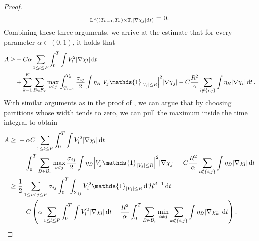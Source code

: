 \begin{proof}
\begin{equation*}
{		}_{ \operatorname{L}^{ 2 } \left(
			( T_{ k - 1 }, T_{ k } ) \times \operatorname{\mathbb{T}} ,
			\abs{ \nabla \chi_{ j } } \dd{ t }
			\right)
		}
		=
		0.
	\end{equation*}
	Combining these three arguments, we arrive at the estimate that for every 
	parameter $ \alpha \in ( 0 , 1 ) $, it holds that
	\begin{align*}
		A \geq &
		- C \alpha 
		\sum_{ 1 \leq l \leq P }
			\int_{ 0 }^{ T }
				\int
					V_{ l }^{ 2 }
				\abs{ \nabla \chi_{ l } }
			\dd{ t }
		\\
		& +
		\sum_{ k = 1 }^{ K }
			\sum_{ B \in \mathcal{ B }_{ r } }
				\max_{ i < j }
					\int_{ T_{ k - 1 } }^{ T_{ k } } 
						\frac{ \sigma_{ i j } }{ 2 }
						\int
							\eta_{ B }
							\abs{ V_{ j } \mathds{ 1 }_{ \abs{ V_{ j } } \leq R 
							} }^{ 2 }
						\abs{ \nabla \chi_{ j } }
					- 
					C \frac{ R^{ 2 } }{ \alpha }
					\sum_{ l \notin \{ i , j \} }
							\int
								\eta_{ B }
							\abs{ \nabla \chi_{ l } }
						\dd{ t }.
	\end{align*}
	With similar arguments as in the proof of 
	, we can argue that by choosing 
	partitions whose width tends to zero, we can pull the maximum inside the 
	time integral to obtain 
	\begin{align*}
		A\geq{}  & 
		- \alpha C
		\sum_{ 1 \leq l \leq P }
		\int_{ 0 }^{ T }
		\int
		V_{ l }^{ 2 }
		\abs{ \nabla \chi_{ l } }
		\dd{ t }
		\\
		& +
		\int_{ 0 }^{ T }
		\sum_{ B \in \mathcal{ B }_{ r } }
		\max_{ i < j }
		\frac{ \sigma_{ i j } }{ 2 }
		\int
		\eta_{ B }
		\abs{ V_{ j } \mathds{ 1 }_{ \abs{ V_{ j } } \leq R 
		} }^{ 2 }
		\abs{ \nabla \chi_{ j } }
		- 
		C \frac{ R^{ 2 } }{ \alpha }
		\sum_{ l \notin \{ i , j \} }
		\int
		\eta_{ B }
		\abs{ \nabla \chi_{ l } }
		\dd{ t }
		\\
		\geq{} &
		\frac{ 1 }{ 2 }
		\sum_{ 1 \leq i < j \leq P }
			\sigma_{ i j }
			\int_{ 0 }^{ T }
				\int_{ \Sigma_{ i j } }
					V_{ i }^{ 2 } \mathds{ 1 }_{ \abs{ V_{ i } } \leq R }
				\dd{ \hm^{ d - 1 } }
			\dd{ t }
		\\
		& -
		C \left(
			\alpha \sum_{ 1 \leq l \leq P }
				\int_{ 0 }^{ T }
					\int
						V_{ l }^{ 2 }
					\abs{ \nabla \chi_{ l } }
				\dd{ t }
			+
			\frac{ R^{ 2 } }{ \alpha }
			\int_{ 0 }^{ T }
				\sum_{ B \in \mathcal{ B }_{ r } }
					\min_{ i \neq j }
						\sum_{ k \notin \{ i , j \} }
							\int
								\eta_{ B }
							\abs{ \nabla \chi_{ k } }
			\dd{ t }
		\right).
	\end{align*}

\end{proof}
